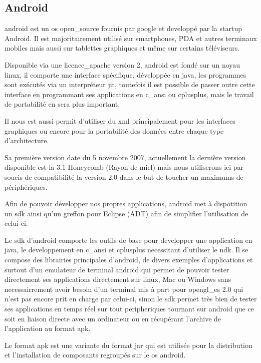 \subsection{Android}

	\gls{android} est un \gls{os} \gls{open_source} fournis par \gls{google} et
	developpé par la startup Android.
	Il est majoritairement utilisé sur smartphones, PDA et autres terminaux
	mobiles mais aussi sur tablettes graphiques et même sur certains téléviseurs.
	
	Disponible via une \gls{licence_apache} version 2, \gls{android} est fondé  sur
	un noyau \gls{linux}, il comporte une interface spécifique, développée en \gls{java},
	les programmes sont exécutés via un interpréteur \gls{jit}, toutefois il est possible
	de passer outre cette interface en programmant ses applications en \gls{c_ansi} ou \gls{cplusplus},
	mais le travail de portabilité en sera plus important.
	
	Il nous est aussi permit d'utiliser du \gls{xml} principalement pour les interfaces
	graphiques ou encore pour la portabilité des données entre chaque type
	d'architecture.
	
	Sa première version date du 5 novembre 2007, actuellement la dernière version
	disponible est la 3.1 Honeycomb (Rayon de miel) mais nous utiliserons ici par
	soucis de compatibilité la version 2.0 dans le but de toucher un maximums de
	périphériques.
	
	Afin de pouvoir développer nos propres applications, \gls{android} met à
	dispotition un \gls{sdk} ainsi qu'un greffon pour Eclipse
	(ADT) afin de simplifier l'utilisation de celui-ci.
	
	Le \gls{sdk} d'\gls{android} comporte les outils de base pour developper une application en
	\gls{java}, le developpement en \gls{c_ansi} et \gls{cplusplus} necessitant d'utiliser le \gls{ndk}.
	Il se compose des librairies principales d'\gls{android}, de divers exemples
	d'applications et surtout d'un emulateur de terminal \gls{android} qui permet de
	pouvoir tester directement ses applications directement sur \gls{linux}, Mac ou
	Windows sans necessairrement avoir besoin d'un terminal mis à part pour
	\gls{opengl_es} 2.0 qui n'est pas encore prit en charge par celui-ci, sinon le \gls{sdk}
	permet très bien de tester ses applications en temps réel sur tout
	peripheriques tournant sur \gls{android} que ce soit en liaison directe avec un
	ordinateur ou en récupérant l'archive de l'application au format \gls{apk}.
	
	Le format \gls{apk} est une variante du format
	\gls{jar} qui est utilisée pour la distribution et l'installation de composants
	regroupés sur le \gls{os} \gls{android}.


